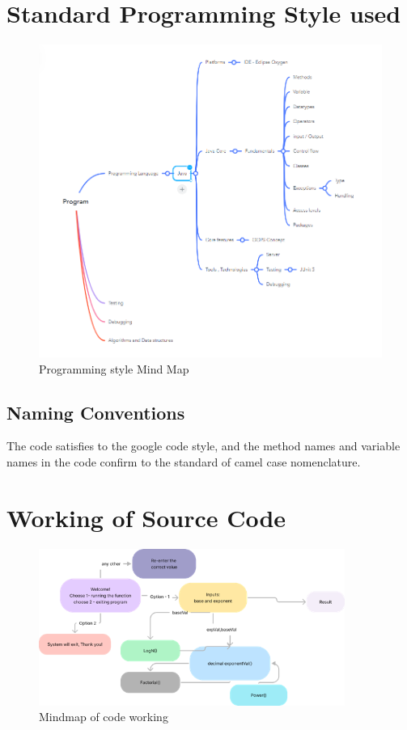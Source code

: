 \documentclass{article}
\begin{document}
\section*{Standard Programming Style used}
\begin{figure}[htp]
    \centering
    \includegraphics[width=17cm]{str-mindmap}
    \caption{Programming style Mind Map}
    \label{fig:galaxy}
\end{figure}
\subsection*{Naming Conventions}
The code satisfies to the google code style, and the method names and variable names in the code confirm to the standard of camel case nomenclature.
\newpage
\section*{Working of Source Code}
\begin{figure}[htp]
    \centering
    \includegraphics[width=10cm]{code-mindmap}
    \caption{Mindmap of code working}
    \label{fig:galaxy}
\end{figure}
\end{document}
